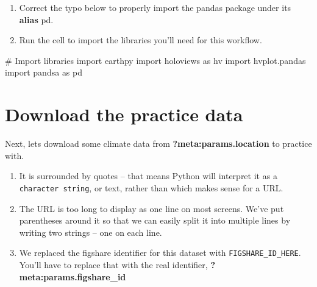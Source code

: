 \documentclass[
  letterpaper,
  DIV=11,
  numbers=noendperiod,
  oneside]{scrreprt}
\newenvironment{Shaded}{\begin{snugshade}}{\end{snugshade}}
\newcommand{\CommentTok}[1]{\textcolor[rgb]{0.37,0.37,0.37}{#1}}
\newcommand{\ImportTok}[1]{\textcolor[rgb]{0.00,0.46,0.62}{#1}}
\newcommand{\NormalTok}[1]{\textcolor[rgb]{0.00,0.23,0.31}{#1}}
\providecommand{\tightlist}{%
  \setlength{\itemsep}{0pt}\setlength{\parskip}{0pt}}
\begin{document}
\begin{tcolorbox}[enhanced jigsaw, colbacktitle=quarto-callout-color!10!white, opacityback=0, bottomtitle=1mm, toptitle=1mm, bottomrule=.15mm, left=2mm, colframe=quarto-callout-color-frame, leftrule=.75mm, opacitybacktitle=0.6, colback=white, rightrule=.15mm, toprule=.15mm, breakable, titlerule=0mm, title=\textcolor{quarto-callout-color}{\faInfo}\hspace{0.5em}{Try It: Import packages}, coltitle=black, arc=.35mm]

\begin{enumerate}
\def\labelenumi{\arabic{enumi}.}
\tightlist
\item
  Correct the typo below to properly import the pandas package under its
  \textbf{alias} pd.
\item
  Run the cell to import the libraries you'll need for this workflow.
\end{enumerate}

\end{tcolorbox}

\begin{Shaded}
\begin{Highlighting}[]
\CommentTok{\# Import libraries}
\ImportTok{import}\NormalTok{ earthpy}
\ImportTok{import}\NormalTok{ holoviews }\ImportTok{as}\NormalTok{ hv}
\ImportTok{import}\NormalTok{ hvplot.pandas}
\ImportTok{import}\NormalTok{ pandsa }\ImportTok{as}\NormalTok{ pd}
\end{Highlighting}
\end{Shaded}

\section{Download the practice data}\label{download-the-practice-data}

Next, lets download some climate data from
\textbf{?meta:params.location} to practice with.

\begin{enumerate}
\def\labelenumi{\arabic{enumi}.}
\tightlist
\item
  It is surrounded by quotes -- that means Python will interpret it as a
  \texttt{character\ string}, or text, rather than which makes sense for
  a URL.
\item
  The URL is too long to display as one line on most screens. We've put
  parentheses around it so that we can easily split it into multiple
  lines by writing two strings -- one on each line.
\item
  We replaced the figshare identifier for this dataset with
  \texttt{\textquotesingle{}FIGSHARE\_ID\_HERE\textquotesingle{}}.
  You'll have to replace that with the real identifier,
  \textbf{?meta:params.figshare\_id}
\end{enumerate}
\end{document}
